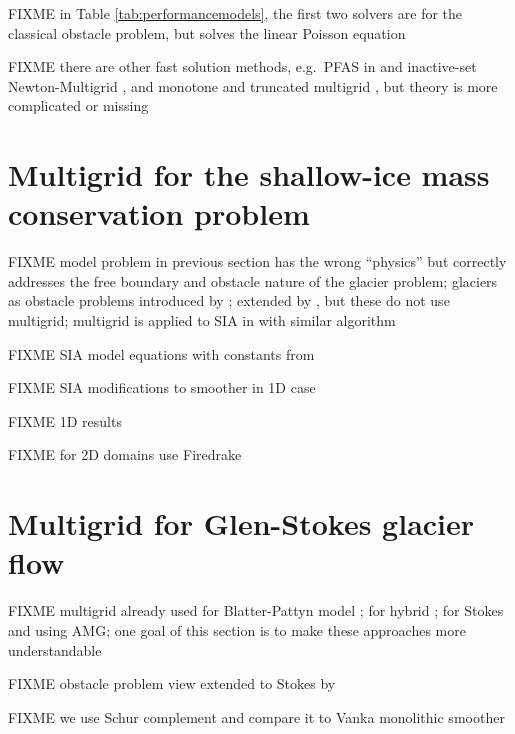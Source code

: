 \documentclass[letterpaper,final,12pt,reqno]{amsart}
\theoremstyle{claim}
\numberwithin{equation}{section}
\numberwithin{figure}{section}
\numberwithin{table}{section}
\numberwithin{theorem}{section}
\begin{document}
FIXME in Table \ref{tab:performancemodels}, the first two solvers are for the classical obstacle problem, but  solves the linear Poisson equation

FIXME there are other fast solution methods, e.g.~PFAS in \cite{BrandtCryer1983} and inactive-set Newton-Multigrid \cite[Chapter 12]{Bueler2021}, and monotone and truncated multigrid \cite{GraeserKornhuber2009}, but theory is more complicated or missing

\section{Multigrid for the shallow-ice mass conservation problem} \label{sec:sia}

FIXME model problem in previous section has the wrong ``physics'' but correctly addresses the free boundary and obstacle nature of the glacier problem; glaciers as obstacle problems introduced by \cite{Calvoetal2002}; extended by \cite{Bueler2016,Bueler2020,JouvetBueler2012}, but these do not use multigrid; multigrid is applied to SIA in \cite{Jouvetetal2013,JouvetGraeser2013} with similar algorithm

FIXME SIA model equations \cite{Bueler2016} with constants from \cite{Huybrechtsetal1996}

FIXME SIA modifications to smoother in 1D case

FIXME 1D results

FIXME for 2D domains use Firedrake


\section{Multigrid for Glen-Stokes glacier flow} \label{sec:stokes}

FIXME multigrid already used for Blatter-Pattyn model \cite{BrownSmithAhmadia2013}; for hybrid \cite{Jouvetetal2013,JouvetGraeser2013}; for Stokes \cite{IsaacStadlerGhattas2015} and \cite{Tuminaroetal2016} using AMG; one goal of this section is to make these approaches more understandable

FIXME obstacle problem view extended to Stokes by \cite{WirbelJarosch2020}

FIXME we use Schur complement \cite{Bueler2021,Elmanetal2014} and compare it to Vanka monolithic smoother \cite{Farrelletal2019}

\small

\bigskip


\end{document}
